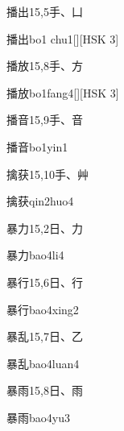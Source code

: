\begin{entry}{播出}{15,5}{⼿、⼐}
  \begin{phonetics}{播出}{bo1 chu1}[][HSK 3]
  \end{phonetics}
\end{entry}

\begin{entry}{播放}{15,8}{⼿、⽅}
  \begin{phonetics}{播放}{bo1fang4}[][HSK 3]
  \end{phonetics}
\end{entry}

\begin{entry}{播音}{15,9}{⼿、⾳}
  \begin{phonetics}{播音}{bo1yin1}
  \end{phonetics}
\end{entry}

\begin{entry}{擒获}{15,10}{⼿、⾋}
  \begin{phonetics}{擒获}{qin2huo4}
  \end{phonetics}
\end{entry}

\begin{entry}{暴力}{15,2}{⽇、⼒}
  \begin{phonetics}{暴力}{bao4li4}
  \end{phonetics}
\end{entry}

\begin{entry}{暴行}{15,6}{⽇、⾏}
  \begin{phonetics}{暴行}{bao4xing2}
  \end{phonetics}
\end{entry}

\begin{entry}{暴乱}{15,7}{⽇、⼄}
  \begin{phonetics}{暴乱}{bao4luan4}
  \end{phonetics}
\end{entry}

\begin{entry}{暴雨}{15,8}{⽇、⾬}
  \begin{phonetics}{暴雨}{bao4yu3}
  \end{phonetics}
\end{entry}

